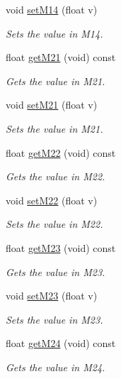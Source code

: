 \begin{DoxyCompactItemize}
void \hyperlink{class_matrix4_a1b7218ea3c9046271d83eef0c8b0446e}{set\-M14} (float v)
\begin{DoxyCompactList}\small\item\em \-Sets the value in \-M14. \end{DoxyCompactList}\item 
float \hyperlink{class_matrix4_aac84fba5ab8d6c00695d7fd0ca900177}{get\-M21} (void) const 
\begin{DoxyCompactList}\small\item\em \-Gets the value in \-M21. \end{DoxyCompactList}\item 
void \hyperlink{class_matrix4_a9ea05b78ad455c547163b8737ac157d7}{set\-M21} (float v)
\begin{DoxyCompactList}\small\item\em \-Sets the value in \-M21. \end{DoxyCompactList}\item 
float \hyperlink{class_matrix4_a978cd7b4e9745aacd7a52dba163b8984}{get\-M22} (void) const 
\begin{DoxyCompactList}\small\item\em \-Gets the value in \-M22. \end{DoxyCompactList}\item 
void \hyperlink{class_matrix4_ad50dcdac12951bc3acd0c0ba3d23e539}{set\-M22} (float v)
\begin{DoxyCompactList}\small\item\em \-Sets the value in \-M22. \end{DoxyCompactList}\item 
float \hyperlink{class_matrix4_aface81ee3d90708b7e8277bf9bd4cd16}{get\-M23} (void) const 
\begin{DoxyCompactList}\small\item\em \-Gets the value in \-M23. \end{DoxyCompactList}\item 
void \hyperlink{class_matrix4_af85269c8843ce2f25b5e13d43382bd57}{set\-M23} (float v)
\begin{DoxyCompactList}\small\item\em \-Sets the value in \-M23. \end{DoxyCompactList}\item 
float \hyperlink{class_matrix4_a05fe6efbbce71f5218fb7bd3d7b428ac}{get\-M24} (void) const 
\begin{DoxyCompactList}\small\item\em \-Gets the value in \-M24. \end{DoxyCompactList}\item 

\end{DoxyCompactItemize}
